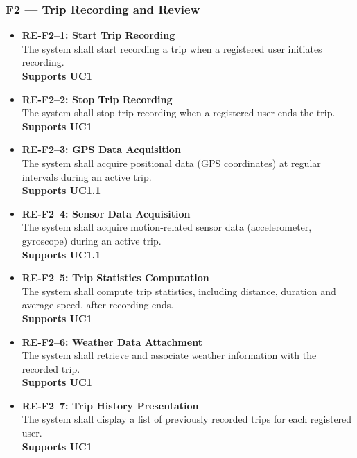 \subsubsection*{F2 --- Trip Recording and Review}\label{sec:F2}

\begin{itemize}

    \item \textbf{RE-F2--1: Start Trip Recording}\label{req:RE-F2-1}\\
    The system shall start recording a trip when a registered user initiates recording.\\
    \textbf{Supports UC1}

    \item \textbf{RE-F2--2: Stop Trip Recording}\label{req:RE-F2-2}\\
    The system shall stop trip recording when a registered user ends the trip.\\
    \textbf{Supports UC1}

    \item \textbf{RE-F2--3: GPS Data Acquisition}\label{req:RE-F2-3}\\
    The system shall acquire positional data (GPS coordinates) at regular intervals 
    during an active trip.\\
    \textbf{Supports UC1.1}

    \item \textbf{RE-F2--4: Sensor Data Acquisition}\label{req:RE-F2-4}\\
    The system shall acquire motion-related sensor data (accelerometer, gyroscope) 
    during an active trip.\\
    \textbf{Supports UC1.1}

    \item \textbf{RE-F2--5: Trip Statistics Computation}\label{req:RE-F2-5}\\
    The system shall compute trip statistics, including distance, duration and average speed, 
    after recording ends.\\
    \textbf{Supports UC1}

    \item \textbf{RE-F2--6: Weather Data Attachment}\label{req:RE-F2-6}\\
    The system shall retrieve and associate weather information with the recorded trip.\\
    \textbf{Supports UC1}

    \item \textbf{RE-F2--7: Trip History Presentation}\label{req:RE-F2-7}\\
    The system shall display a list of previously recorded trips for each registered user.\\
    \textbf{Supports UC1}


\end{itemize}

